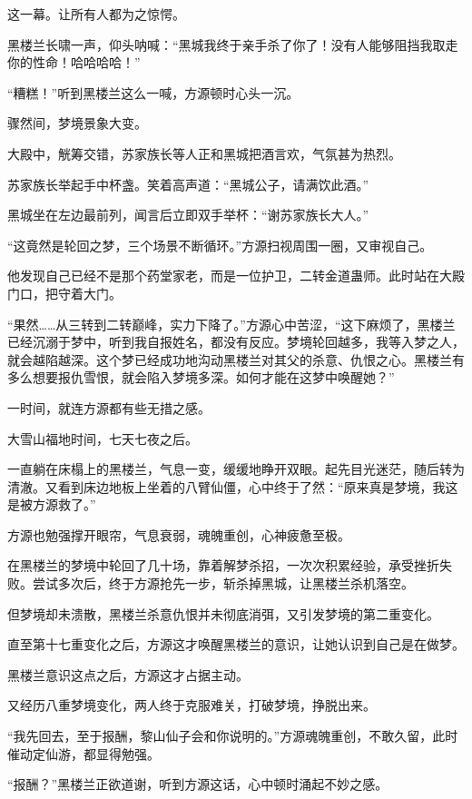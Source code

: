 \begin{this_body}
这一幕。让所有人都为之惊愕。

黑楼兰长啸一声，仰头呐喊：“黑城我终于亲手杀了你了！没有人能够阻挡我取走你的性命！哈哈哈哈！”

“糟糕！”听到黑楼兰这么一喊，方源顿时心头一沉。

骤然间，梦境景象大变。

大殿中，觥筹交错，苏家族长等人正和黑城把酒言欢，气氛甚为热烈。

苏家族长举起手中杯盏。笑着高声道：“黑城公子，请满饮此酒。”

黑城坐在左边最前列，闻言后立即双手举杯：“谢苏家族长大人。”

“这竟然是轮回之梦，三个场景不断循环。”方源扫视周围一圈，又审视自己。

他发现自己已经不是那个药堂家老，而是一位护卫，二转金道蛊师。此时站在大殿门口，把守着大门。

“果然……从三转到二转巅峰，实力下降了。”方源心中苦涩，“这下麻烦了，黑楼兰已经沉溺于梦中，听到我自报姓名，都没有反应。梦境轮回越多，我等入梦之人，就会越陷越深。这个梦已经成功地沟动黑楼兰对其父的杀意、仇恨之心。黑楼兰有多么想要报仇雪恨，就会陷入梦境多深。如何才能在这梦中唤醒她？”

一时间，就连方源都有些无措之感。

大雪山福地时间，七天七夜之后。

一直躺在床榻上的黑楼兰，气息一变，缓缓地睁开双眼。起先目光迷茫，随后转为清澈。又看到床边地板上坐着的八臂仙僵，心中终于了然：“原来真是梦境，我这是被方源救了。”

方源也勉强撑开眼帘，气息衰弱，魂魄重创，心神疲惫至极。

在黑楼兰的梦境中轮回了几十场，靠着解梦杀招，一次次积累经验，承受挫折失败。尝试多次后，终于方源抢先一步，斩杀掉黑城，让黑楼兰杀机落空。

但梦境却未溃散，黑楼兰杀意仇恨并未彻底消弭，又引发梦境的第二重变化。

直至第十七重变化之后，方源这才唤醒黑楼兰的意识，让她认识到自己是在做梦。

黑楼兰意识这点之后，方源这才占据主动。

又经历八重梦境变化，两人终于克服难关，打破梦境，挣脱出来。

“我先回去，至于报酬，黎山仙子会和你说明的。”方源魂魄重创，不敢久留，此时催动定仙游，都显得勉强。

“报酬？”黑楼兰正欲道谢，听到方源这话，心中顿时涌起不妙之感。

\end{this_body}

